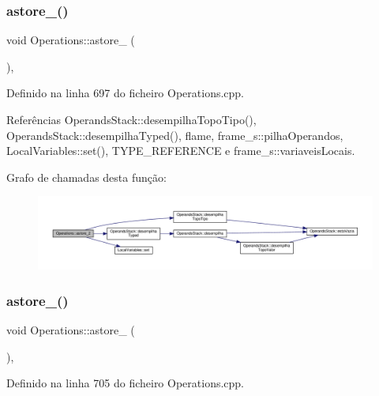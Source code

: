 \subsubsection{\texorpdfstring{astore\+\_()}{astore\_2()}}
{\footnotesize\ttfamily void Operations\+::astore\+\_ (\begin{DoxyParamCaption}{ }\end{DoxyParamCaption})\hspace{0.3cm}{\ttfamily [static]}, {\ttfamily [private]}}



Definido na linha 697 do ficheiro Operations.\+cpp.



Referências Operands\+Stack\+::desempilha\+Topo\+Tipo(), Operands\+Stack\+::desempilha\+Typed(), flame, frame\+\_\+s\+::pilha\+Operandos, Local\+Variables\+::set(), T\+Y\+P\+E\+\_\+\+R\+E\+F\+E\+R\+E\+N\+CE e frame\+\_\+s\+::variaveis\+Locais.

Grafo de chamadas desta função\+:
\nopagebreak
\begin{figure}[H]
\begin{center}
\leavevmode
\includegraphics[width=350pt]{classOperations_a01e238bbea0f9d61d80a8fcd3ed2f660_cgraph}
\end{center}
\end{figure}
\mbox{\label{classOperations_ac3c02b3ff78b6222bd58bebb4f01c083}} 
\subsubsection{\texorpdfstring{astore\+\_()}{astore\_3()}}
{\footnotesize\ttfamily void Operations\+::astore\+\_ (\begin{DoxyParamCaption}{ }\end{DoxyParamCaption})\hspace{0.3cm}{\ttfamily [static]}, {\ttfamily [private]}}



Definido na linha 705 do ficheiro Operations.\+cpp.



